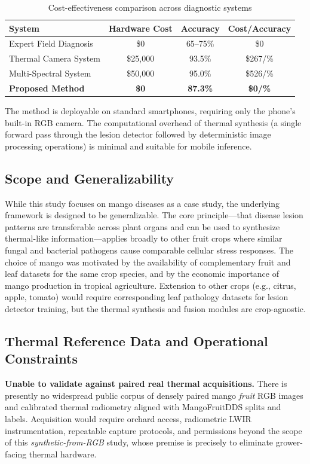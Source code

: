 \documentclass[utf8]{FrontiersinHarvard} %
\begin{document}
\begin{table}[h!]
    \centering
    \caption{Cost-effectiveness comparison across diagnostic systems}
    \label{tab:cost}
    \footnotesize
    \begin{tabular}{lccc}
        \toprule
        \textbf{System} & \textbf{Hardware Cost} & \textbf{Accuracy} & \textbf{Cost/Accuracy} \\
        \midrule
        Expert Field Diagnosis & \$0 & 65--75\% & \$0 \\
        Thermal Camera System & \$25,000 & 93.5\% & \$267/\% \\
        Multi-Spectral System & \$50,000 & 95.0\% & \$526/\% \\
        \textbf{Proposed Method} & \textbf{\$0} & \textbf{87.3\%} & \textbf{\$0/\%} \\
        \bottomrule
    \end{tabular}
\end{table}

The method is deployable on standard smartphones, requiring only the phone's built-in RGB camera. The computational overhead of thermal synthesis (a single forward pass through the lesion detector followed by deterministic image processing operations) is minimal and suitable for mobile inference.

\subsection{Scope and Generalizability}
While this study focuses on mango diseases as a case study, the underlying framework is designed to be generalizable. The core principle---that disease lesion patterns are transferable across plant organs and can be used to synthesize thermal-like information---applies broadly to other fruit crops where similar fungal and bacterial pathogens cause comparable cellular stress responses. The choice of mango was motivated by the availability of complementary fruit and leaf datasets for the same crop species, and by the economic importance of mango production in tropical agriculture. Extension to other crops (e.g., citrus, apple, tomato) would require corresponding leaf pathology datasets for lesion detector training, but the thermal synthesis and fusion modules are crop-agnostic.

\subsection{Thermal Reference Data and Operational Constraints}
\label{sec:limitations_scope}
\textbf{Unable to validate against paired real thermal acquisitions.} There is presently no widespread public corpus of densely paired mango \emph{fruit} RGB images and calibrated thermal radiometry aligned with MangoFruitDDS splits and labels. Acquisition would require orchard access, radiometric LWIR instrumentation, repeatable capture protocols, and permissions beyond the scope of this \emph{synthetic-from-RGB} study, whose premise is precisely to eliminate grower-facing thermal hardware.
\end{document}
